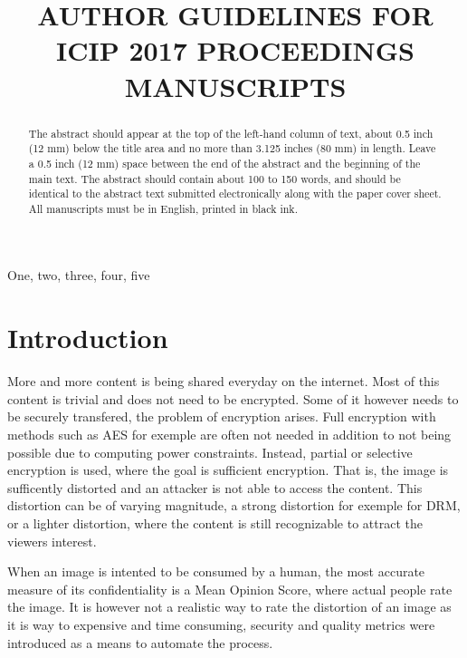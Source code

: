 \documentclass{article}
\title{AUTHOR GUIDELINES FOR ICIP 2017 PROCEEDINGS MANUSCRIPTS}
\begin{document}
%
\maketitle
%
\begin{abstract}
The abstract should appear at the top of the left-hand column of text, about
0.5 inch (12 mm) below the title area and no more than 3.125 inches (80 mm) in
length.  Leave a 0.5 inch (12 mm) space between the end of the abstract and the
beginning of the main text.  The abstract should contain about 100 to 150
words, and should be identical to the abstract text submitted electronically
along with the paper cover sheet.  All manuscripts must be in English, printed
in black ink.
\end{abstract}
%
\begin{keywords}
One, two, three, four, five
\end{keywords}
%
\section{Introduction}
\label{sec:intro}
More and more content is being shared everyday on the internet. Most of this content is trivial and does not need to be encrypted. Some of it however needs to be securely transfered, the problem of encryption arises. Full encryption with methods such as AES for exemple are often not needed in addition to not being possible due to computing power constraints. Instead, partial or selective encryption is used, where the goal is sufficient encryption. That is, the image is sufficently distorted and an attacker is not able to access the content. This distortion can be of varying magnitude, a strong distortion for exemple for DRM, or a lighter distortion, where the content is still recognizable to attract the viewers interest.

When an image is intented to be consumed by a human, the most accurate measure of its confidentiality is a Mean Opinion Score, where actual people rate the image. It is however not a realistic way to rate the distortion of an image as it is way to expensive and time consuming, security and quality metrics were introduced as a means to automate the process.
\end{document}
